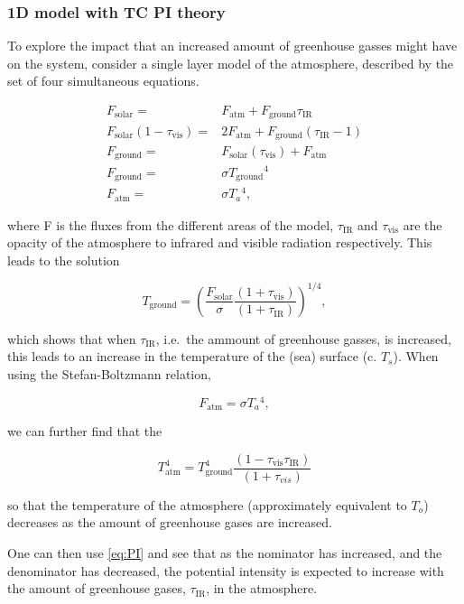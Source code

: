 \subsubsection{1D model with TC PI theory}
\label{sec:1d-hurr}
To explore the impact that an increased amount of greenhouse gasses might have
on the system, consider a single layer model of the atmosphere, described by the
set of four simultaneous equations.

\begin{eqnarray}
F_{\mathrm{solar}} =& F_{\mathrm{atm}} + F_{\mathrm{ground}}\tau_{\mathrm{IR}}\\
F_{\mathrm{solar}}(1-\tau_{\mathrm{vis}}) =& 2F_{\mathrm{atm}} + F_{\mathrm{ground}}(\tau_{\mathrm{IR}}-1)\\
F_{\mathrm{ground}} = & F_{\mathrm{solar}}(\tau_{\mathrm{vis}}) +F_{\mathrm{atm}}  \\
F_{\mathrm{ground}} = & \sigma T_{\mathrm{ground}}{}^4 \\
F_{\mathrm{atm}} = & \sigma T_a{}^{4},
\end{eqnarray}

where F is the fluxes from the different areas of the model,
$ \tau_{\mathrm{IR}}$ and $\tau_{\mathrm{vis}}$ are the opacity of the atmosphere
to infrared and visible radiation respectively.
This leads to the solution

\begin{equation}
T_{\mathrm{ground}} = \left( \frac{F_{\mathrm{solar}}}{\sigma}\frac{(1+\tau_{\mathrm{vis}})}{(1+\tau_{\mathrm{IR}})}\right)^{1/4},
\end{equation}

which shows that when $\tau_{\mathrm{IR}}$, i.e.~the ammount of greenhouse gasses,
is increased, this leads to an increase in the temperature of the (sea) surface (c. $T_s$).
When using the Stefan-Boltzmann relation,

\begin{equation}
F_{\mathrm{atm}} = \sigma T_a{}^{4},
\end{equation}

we can further find that the

\begin{equation}
T_{\mathrm{atm}}^{4}=T_{\mathrm{ground}}^4\frac{(1-\tau_{\mathrm{vis}}\tau_{\mathrm{IR}})}{(1+\tau_{vis})}
\end{equation}

so that the temperature of the atmosphere (approximately equivalent to $T_{o}$)
decreases as the amount of greenhouse gases are increased.


One can then use \ref{eq:PI} and see that as the nominator has increased, and the
denominator has decreased, the potential intensity is expected to increase with the
amount of greenhouse gases, $\tau_{\mathrm{IR}}$, in the atmosphere.
